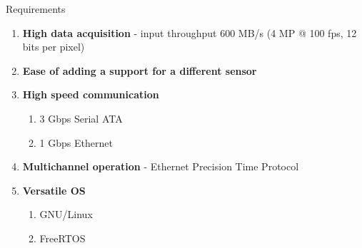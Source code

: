 \documentclass[10pt]{beamer}
\begin{document}
\begin{frame}{Requirements}

    \begin{enumerate}
        \item \textbf{High data acquisition} - input throughput 600 MB/s (4 MP @ 100 fps, 12 bits per pixel) 
        \item \textbf{Ease of adding a support for a different sensor}
        \item \textbf{High speed communication} 
            \begin{enumerate}
                \item 3 Gbps Serial ATA 
                \item 1 Gbps Ethernet 
            \end{enumerate}
        \item \textbf{Multichannel operation} - Ethernet Precision Time Protocol 
        \item \textbf{Versatile OS}
            \begin{enumerate}
                \item GNU/Linux 
                \item FreeRTOS  
            \end{enumerate}

    \end{enumerate}
\end{frame}
%
\end{document}
